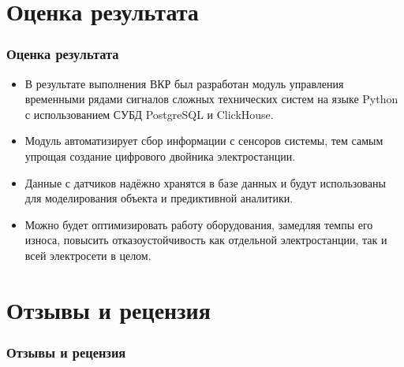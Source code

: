 \documentclass[pdf, hyperref={unicode}, aspectratio=169]{beamer}
\begin{document}
\section{Оценка результата}
\begin{frame}
	\frametitle{Оценка результата}
	
	\begin{itemize}
		\item В результате выполнения ВКР был разработан модуль управления временными рядами сигналов сложных технических систем на языке Python с использованием СУБД PostgreSQL и ClickHouse.
		\item Модуль автоматизирует сбор информации с сенсоров системы, тем самым упрощая создание цифрового двойника электростанции.
		\item Данные с датчиков надёжно хранятся в базе данных и будут использованы для моделирования объекта и предиктивной аналитики.
		\item Можно будет оптимизировать работу оборудования, замедляя темпы его износа, повысить отказоустойчивость как отдельной электростанции, так и всей электросети в целом.
	\end{itemize}
\end{frame}


\section{Отзывы и рецензия}
\begin{frame}
	\frametitle{Отзывы и рецензия}
	
	\begin{columns}
		
	\end{columns}
\end{frame}
\end{document}
